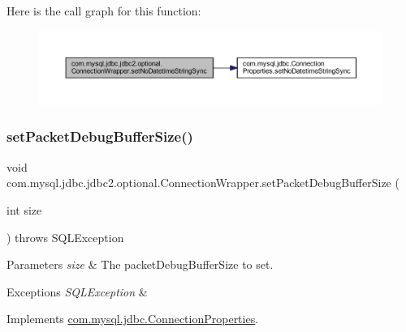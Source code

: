 Here is the call graph for this function\+:
\nopagebreak
\begin{figure}[H]
\begin{center}
\leavevmode
\includegraphics[width=350pt]{classcom_1_1mysql_1_1jdbc_1_1jdbc2_1_1optional_1_1_connection_wrapper_a5df2417575df4f6bdb7ba14ffc39b979_cgraph}
\end{center}
\end{figure}
\mbox{\label{classcom_1_1mysql_1_1jdbc_1_1jdbc2_1_1optional_1_1_connection_wrapper_aaf10a4fb7d7079348a8ad47aafc4dedb}} 
\subsubsection{\texorpdfstring{set\+Packet\+Debug\+Buffer\+Size()}{setPacketDebugBufferSize()}}
{\footnotesize\ttfamily void com.\+mysql.\+jdbc.\+jdbc2.\+optional.\+Connection\+Wrapper.\+set\+Packet\+Debug\+Buffer\+Size (\begin{DoxyParamCaption}\item[{int}]{size }\end{DoxyParamCaption}) throws S\+Q\+L\+Exception}


\begin{DoxyParams}{Parameters}
{\em size} & The packet\+Debug\+Buffer\+Size to set. \\
\hline
\end{DoxyParams}

\begin{DoxyExceptions}{Exceptions}
{\em S\+Q\+L\+Exception} & \\
\hline
\end{DoxyExceptions}


Implements \mbox{\hyperlink{interfacecom_1_1mysql_1_1jdbc_1_1_connection_properties_ae0414fc9a146276fb458dc6e6b423f98}{com.\+mysql.\+jdbc.\+Connection\+Properties}}.

